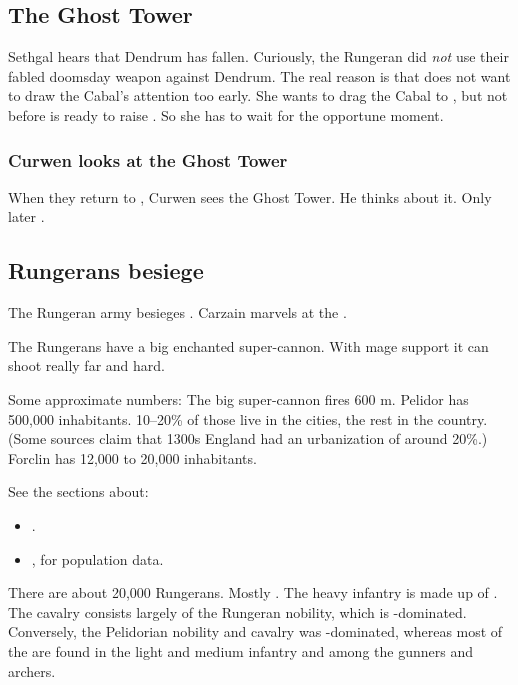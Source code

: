 \subsection{The Ghost Tower}
Sethgal hears that Dendrum has fallen.
Curiously, the Rungeran \ishrah did \emph{not} use their fabled doomsday weapon against Dendrum. 
The real reason is that \Takestsha does not want to draw the Cabal's attention too early.
She wants to drag the Cabal to \Forclin, but not before \Psyrex is ready to raise \Nithdornazsh.
So she has to wait for the opportune moment. 





\subsubsection{Curwen looks at the Ghost Tower}
When they return to \Forclin, Curwen sees the Ghost Tower. 
He thinks about it.
Only later . 









\subsection{Rungerans besiege \Forclin}
The Rungeran army besieges \Forclin. 
Carzain marvels at the . 

The Rungerans have a big enchanted super-cannon. 
With mage support it can shoot really far and hard. 

Some approximate numbers:
The big super-cannon fires 600 m. 
Pelidor has 500,000 inhabitants. 
10--20\% of those live in the cities, the rest in the country.
(Some sources claim that 1300s England had an urbanization of around 20\%.)
Forclin has 12,000 to 20,000 inhabitants. 

See the sections about:
\begin{itemize}
  \item {}. 
  \item {}, for population data. 
\end{itemize}

There are about 20,000 Rungerans. 
Mostly \humans. 
The heavy infantry is made up of \scathae. 
The cavalry consists largely of the Rungeran nobility, which is \human-dominated. 
Conversely, the Pelidorian nobility and cavalry was \scatha-dominated, whereas most of the \humans are found in the light and medium infantry and among the gunners and archers. 

